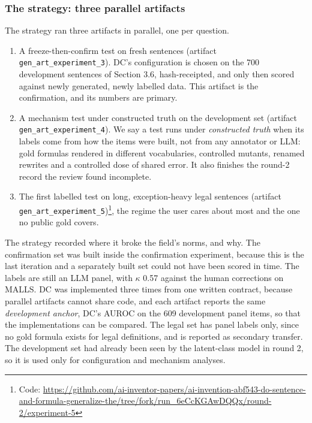 \documentclass[11pt,letterpaper]{article}
\begin{document}
\subsubsection{The strategy: three parallel artifacts}

The strategy ran three artifacts in parallel, one per question.

\begin{enumerate}
\item {}A freeze-then-confirm test on fresh sentences (artifact \texorpdfstring{\textup{\nolinkurl{gen_art_experiment_3}}}{gen art experiment 3}). DC's configuration is chosen on the 700 development sentences of Section 3.6, hash-receipted, and only then scored against newly generated, newly labelled data. This artifact is the confirmation, and its numbers are primary.
\item {}A mechanism test under constructed truth on the development set (artifact \texorpdfstring{\textup{\nolinkurl{gen_art_experiment_4}}}{gen art experiment 4}). We say a test runs under \emph{constructed truth} when its labels come from how the items were built, not from any annotator or LLM: gold formulas rendered in different vocabularies, controlled mutants, renamed rewrites and a controlled dose of shared error. It also finishes the round-2 record the review found incomplete.
\item {}The first labelled test on long, exception-heavy legal sentences (artifact \texorpdfstring{\textup{\nolinkurl{gen_art_experiment_5}}}{gen art experiment 5})\footnote{Code: \url{https://github.com/ai-inventor-papers/ai-invention-abf543-do-sentence-and-formula-generalize-the/tree/fork/run_6eCcKGAwDQQx/round-2/experiment-5}}, the regime the user cares about most and the one no public gold covers.
\end{enumerate}
The strategy recorded where it broke the field's norms, and why. The confirmation set was built inside the confirmation experiment, because this is the last iteration and a separately built set could not have been scored in time. The labels are still an LLM panel, with $\kappa$ 0.57 against the human corrections on MALLS. DC was implemented three times from one written contract, because parallel artifacts cannot share code, and each artifact reports the same \emph{development anchor}, DC's AUROC on the 609 development panel items, so that the implementations can be compared. The legal set has panel labels only, since no gold formula exists for legal definitions, and is reported as secondary transfer. The development set had already been seen by the latent-class model in round 2, so it is used only for configuration and mechanism analyses.
\end{document}
